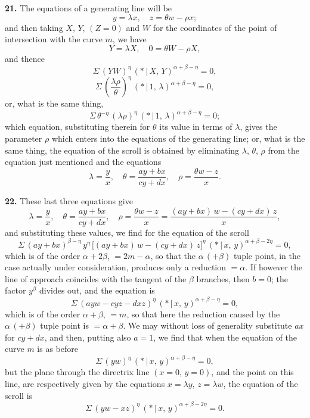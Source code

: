 \documentclass[11pt,a4paper]{article}
\providecommand{\mid}{\,|\,}
\begin{document}
\medskip

\textbf{21.} The equations of a generating line will be
\[
y = \lambda x,\quad z = \theta w - \rho x;
\]
and then taking $X,\,Y,\,(Z = 0)$ and $W$ for the coordinates of the point of intersection with the curve $m$, we have
\[
Y = \lambda X,\quad 0 = \theta W - \rho X,
\]
and thence
\[
\Sigma\,(YW)^{\eta}\,(*\mid X,\,Y)^{\alpha + \beta - \eta} = 0,
\]
\[
\Sigma\,\left(\frac{\lambda\rho}{\theta}\right)^{\eta}\,(*\mid 1,\,\lambda)^{\alpha + \beta - \eta} = 0,
\]
or, what is the same thing,
\[
\Sigma\,\theta^{-\eta}\,(\lambda\rho)^{\eta}\,(*\mid 1,\,\lambda)^{\alpha + \beta - \eta} = 0;
\]
which equation, substituting therein for $\theta$ its value in terms of $\lambda$, gives the parameter $\rho$ which enters into the equations of the generating line; or, what is the same thing, the equation of the scroll is obtained by eliminating $\lambda,\,\theta,\,\rho$ from the equation just mentioned and the equations
\[
\lambda = \frac{y}{x},\quad \theta = \frac{ay + bx}{cy + dx},\quad \rho = \frac{\theta w - z}{x}.
\]

\medskip

\textbf{22.} These last three equations give
\[
\lambda = \frac{y}{x},\quad \theta = \frac{ay + bx}{cy + dx},\quad \rho = \frac{\theta w - z}{x} = \frac{(ay + bx)\,w - (cy + dx)\,z}{x},
\]
and substituting these values, we find for the equation of the scroll
\[
\Sigma\,(ay + bx)^{\beta - \eta}\,y^{\eta}\,\bigl[(ay + bx)\,w - (cy + dx)\,z\bigr]^{\eta}\,(*\mid x,\,y)^{\alpha + \beta - 2\eta} = 0,
\]
which is of the order $\alpha + 2\beta$, $= 2m - \alpha$, so that the $\alpha\,(+\beta)$ tuple point, in the case actually under consideration, produces only a reduction $= \alpha$. If however the line of approach coincides with the tangent of the $\beta$ branches, then $b = 0$; the factor $y^{\beta}$ divides out, and the equation is
\[
\Sigma\,(ayw - cyz - dxz)^{\eta}\,(*\mid x,\,y)^{\alpha + \beta - \eta} = 0,
\]
which is of the order $\alpha + \beta$, $= m$, so that here the reduction caused by the $\alpha\,(+\beta)$ tuple point is $= \alpha + \beta$. We may without loss of generality substitute $ax$ for $cy + dx$, and then, putting also $a = 1$, we find that when the equation of the curve $m$ is as before
\[
\Sigma\,(yw)^{\eta}\,(*\mid x,\,y)^{\alpha + \beta - \eta} = 0,
\]
but the plane through the directrix line $(x = 0,\,y = 0)$, and the point on this line, are respectively given by the equations $x = \lambda y$, $z = \lambda w$, the equation of the scroll is
\[
\Sigma\,(yw - xz)^{\eta}\,(*\mid x,\,y)^{\alpha + \beta - 2\eta} = 0.
\]
\end{document}
